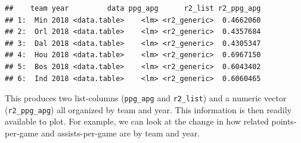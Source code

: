 \documentclass[doc]{apa6}
\newenvironment{Shaded}{\begin{snugshade}}{\end{snugshade}}
\newcommand{\DataTypeTok}[1]{\textcolor[rgb]{0.13,0.29,0.53}{#1}}
\newcommand{\DecValTok}[1]{\textcolor[rgb]{0.00,0.00,0.81}{#1}}
\newcommand{\KeywordTok}[1]{\textcolor[rgb]{0.13,0.29,0.53}{\textbf{#1}}}
\newcommand{\NormalTok}[1]{#1}
\newcommand{\OperatorTok}[1]{\textcolor[rgb]{0.81,0.36,0.00}{\textbf{#1}}}
\newcommand{\StringTok}[1]{\textcolor[rgb]{0.31,0.60,0.02}{#1}}
\begin{document}
\begin{verbatim}
##    team year         data ppg_apg      r2_list r2_ppg_apg
## 1:  Min 2018 <data.table>    <lm> <r2_generic>  0.4662060
## 2:  Orl 2018 <data.table>    <lm> <r2_generic>  0.4357684
## 3:  Dal 2018 <data.table>    <lm> <r2_generic>  0.4305347
## 4:  Hou 2018 <data.table>    <lm> <r2_generic>  0.6967150
## 5:  Bos 2018 <data.table>    <lm> <r2_generic>  0.6043402
## 6:  Ind 2018 <data.table>    <lm> <r2_generic>  0.6060465
\end{verbatim}

\noindent This produces two list-columns (\texttt{ppg\_apg} and \texttt{r2\_list}) and a numeric vector (\texttt{r2\_ppg\_apg}) all organized by team and year. This information is then readily available to plot. For example, we can look at the change in how related points-per-game and assists-per-game are by team and year.

\begin{Shaded}
\end{Shaded}
\end{document}
